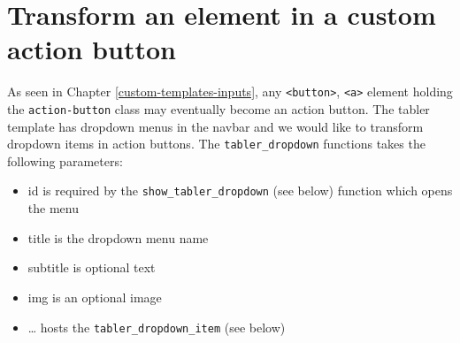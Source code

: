 \documentclass[]{book}
\providecommand{\tightlist}{%
  \setlength{\itemsep}{0pt}\setlength{\parskip}{0pt}}
\begin{document}
\hypertarget{transform-an-element-in-a-custom-action-button}{%
\section{Transform an element in a custom action button}\label{transform-an-element-in-a-custom-action-button}}

As seen in Chapter \ref{custom-templates-inputs}, any \texttt{\textless{}button\textgreater{}}, \texttt{\textless{}a\textgreater{}} element holding the \texttt{action-button} class may eventually become an action button. The tabler template has dropdown menus in the navbar and we would like to transform dropdown items in action buttons. The \texttt{tabler\_dropdown} functions takes the following parameters:

\begin{itemize}
\tightlist
\item
  id is required by the \texttt{show\_tabler\_dropdown} (see below) function which opens the menu
\item
  title is the dropdown menu name
\item
  subtitle is optional text
\item
  img is an optional image
\item
  \ldots{} hosts the \texttt{tabler\_dropdown\_item} (see below)
\end{itemize}
\end{document}
